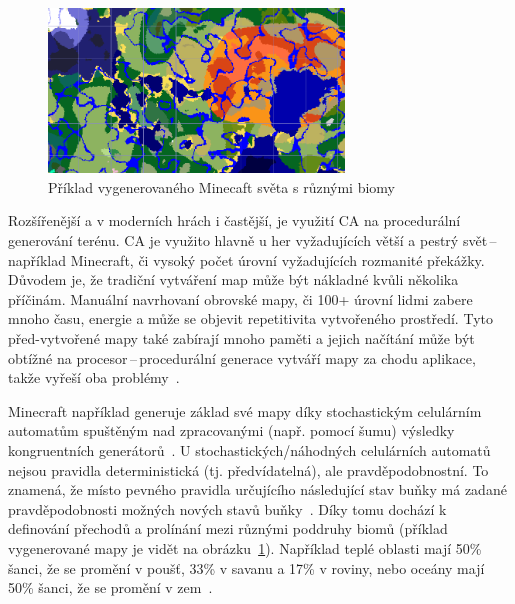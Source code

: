 \begin{figure}[H]
    \centering
    \includegraphics[width=0.7\textwidth]{obrazky-figures/ch2/minecraft_biom.png}
    \caption{Příklad vygenerovaného Minecaft světa s různými biomy}
    \label{fig:minecraft_biom}
\end{figure}

Rozšířenější a v moderních hrách i častější, je využití CA na procedurální generování terénu. CA je využito hlavně u her vyžadujících větší a pestrý svět\,--\,například Minecraft, či vysoký počet úrovní vyžadujících rozmanité překážky. Důvodem je, že tradiční  vytváření map může být nákladné kvůli několika příčinám. Manuální navrhovaní obrovské mapy, či 100+ úrovní lidmi zabere mnoho času, energie a může se objevit repetitivita vytvořeného prostředí. Tyto před-vytvořené mapy také zabírají mnoho paměti a jejich načítání může být obtížné na procesor\,--\,procedurální generace vytváří mapy za chodu aplikace, takže vyřeší oba problémy~\cite{Procedural_Game_Map}.

Minecraft například generuje základ své mapy díky stochastickým celulárním automatům spuštěným nad zpracovanými (např. pomocí šumu) výsledky kongruentních generátorů~\cite{Minecraft}. U stochastických/náhodných celulárních automatů nejsou pravidla deterministická (tj. předvídatelná), ale pravděpodobnostní. To znamená, že místo pevného pravidla určujícího následující stav buňky má zadané pravděpodobnosti možných nových stavů buňky~\cite{DBLP:journals/corr/abs-1304-7185}. Díky tomu dochází k definování přechodů a prolínání mezi různými poddruhy biomů (příklad vygenerované mapy je vidět na obrázku~\ref{fig:minecraft_biom}). Například teplé oblasti mají 50\% šanci, že se promění v poušť, 33\% v savanu a 17\% v roviny, nebo oceány mají 50\% šanci, že se promění v zem~\cite{Minecraft}.

